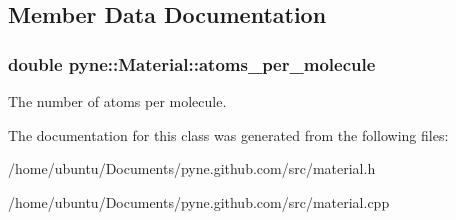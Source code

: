 \subsection{Member Data Documentation}
\subsubsection[{\texorpdfstring{atoms\+\_\+per\+\_\+molecule}{atoms_per_molecule}}]{\setlength{\rightskip}{0pt plus 5cm}double pyne\+::\+Material\+::atoms\+\_\+per\+\_\+molecule}\hypertarget{classpyne_1_1_material_a7ddff1aaebc94bcda22d3422c093a756}{}\label{classpyne_1_1_material_a7ddff1aaebc94bcda22d3422c093a756}
The number of atoms per molecule. 

The documentation for this class was generated from the following files\+:\begin{DoxyCompactItemize}
\item 
/home/ubuntu/\+Documents/pyne.\+github.\+com/src/material.\+h\item 
/home/ubuntu/\+Documents/pyne.\+github.\+com/src/material.\+cpp\end{DoxyCompactItemize}
